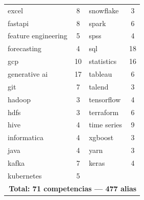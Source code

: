 \begin{table}[H]
\begin{tabular}{|p{4.0cm}|c||p{4.0cm}|c|}
    excel               &  8 & snowflake          &  3 \\
    fastapi             &  8 & spark              &  6 \\
    feature engineering &  5 & spss               &  4 \\
    forecasting         &  4 & sql                & 18 \\
    gcp                 & 10 & statistics         & 16 \\
    generative ai       & 17 & tableau            &  6 \\
    git                 &  7 & talend             &  3 \\
    hadoop              &  3 & tensorflow         &  4 \\
    hdfs                &  3 & terraform          &  6 \\
    hive                &  4 & time series        &  9 \\
    informatica         &  4 & xgboost            &  3 \\
    java                &  4 & yarn               &  3 \\
    kafka               &  7 & keras              &  4 \\
    kubernetes          &  5 & & \\
    \hline
    \multicolumn{4}{|r|}{\textbf{Total: 71 competencias — 477 alias}} \\
    \hline
  \end{tabular}
\end{table}
